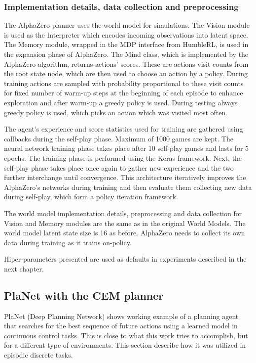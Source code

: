 \subsubsection{Implementation details, data collection and preprocessing}

The AlphaZero planner uses the world model for simulations. The Vision module is used as the Interpreter which encodes incoming observations into latent space. The Memory module, wrapped in the MDP interface from HumbleRL, is used in the expansion phase of AlphaZero. The Mind class, which is implemented by the AlphaZero algorithm, returns actions' scores. These are actions visit counts from the root state node, which are then used to choose an action by a policy. During training actions are sampled with probability proportional to these visit counts for fixed number of warm-up steps at the beginning of each episode to enhance exploration and after warm-up a greedy policy is used. During testing always greedy policy is used, which picks an action which was visited most often.

The agent's experience and score statistics used for training are gathered using callbacks during the self-play phase. Maximum of 1000 games are kept. The neural network training phase takes place after 10 self-play games and lasts for 5 epochs. The training phase is performed using the Keras \cite{Code.Keras} framework. Next, the self-play phase takes place once again to gather new experience and the two further interchange until convergence. This architecture iteratively improves the AlphaZero's networks during training and then evaluate them collecting new data during self-play, which form a policy iteration framework.

The world model implementation details, preprocessing and data collection for Vision and Memory modules are the same as in the original World Models. The world model latent state size is 16 as before. AlphaZero needs to collect its own data during training as it trains on-policy.

Hiper-parameters presented are used as defaults in experiments described in the next chapter.

\subsection{PlaNet with the CEM planner}

PlaNet (Deep Planning Network) \cite{Algo.PlaNet} shows working example of a planning agent that searches for the best sequence of future actions using a learned model in continuous control tasks. This is close to what this work tries to accomplish, but for a different type of environments. This section describe how it was utilized in episodic discrete tasks.

